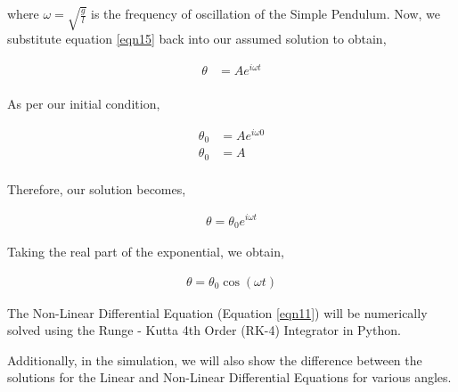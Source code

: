 \documentclass[12pt]{article}
\begin{document}
where $\omega = \sqrt{\frac{g}{l}}$ is the frequency of oscillation of the Simple Pendulum.
Now, we substitute equation \ref{eqn15} back into our assumed solution to obtain,

\begin{equation} \label{eqn16}
    \begin{split}
       \theta &= A e^{i \omega t} \\
    \end{split}
\end{equation}

As per our initial condition,

\begin{equation} \label{eqn17}
    \begin{split}
      \theta_{0} &= A e^{i \omega 0} \\
      \theta_{0} &= A \\
    \end{split}
\end{equation}

Therefore, our solution becomes,

\begin{equation} \label{eqn18}
    \begin{split}
        \theta = \theta_{0} e^{i \omega t}
    \end{split}
\end{equation}

Taking the real part of the exponential, we obtain,

\begin{equation} \label{eqn19}
    \begin{split}
        \theta = \theta_{0} \cos{ (\omega t) }
    \end{split}
\end{equation}

The Non-Linear Differential Equation (Equation \ref{eqn11}) will be numerically solved using the
Runge - Kutta 4th Order (RK-4) Integrator in Python.

Additionally, in the simulation, we will also show the difference between the solutions for
the Linear and Non-Linear Differential Equations for various angles.
\end{document}
